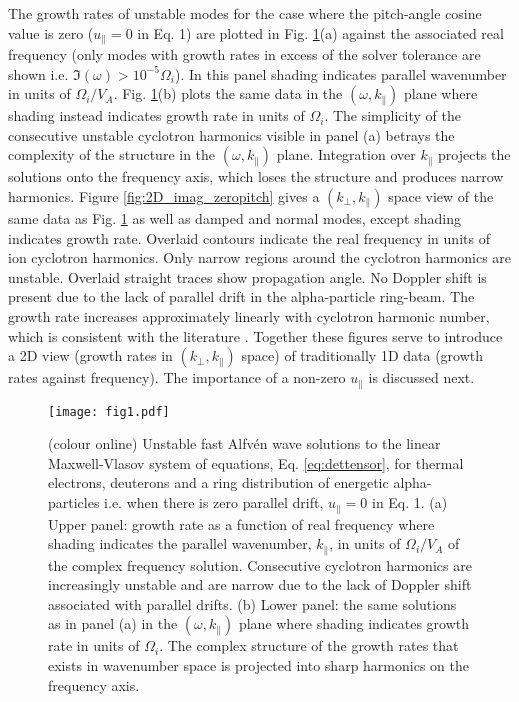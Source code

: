 \documentclass[12pt]{iopart}
\begin{document}
The growth rates of unstable modes for the case where the pitch-angle cosine
value is zero ($u_\parallel = 0$ in Eq. 1) are plotted in Fig.
\ref{fig:2D_F12_zeropitch}(a) against the associated real frequency (only modes
with growth rates in excess of the solver tolerance are shown i.e. $\Im(\omega)
> 10^{-5} \Omega_i$). In this panel shading indicates parallel wavenumber in
units of $\Omega_i/V_A$. Fig. \ref{fig:2D_F12_zeropitch}(b) plots the same data
in the $(\omega,k_\parallel)$ plane where shading instead indicates growth
rate in units of $\Omega_i$.
The simplicity of the consecutive unstable cyclotron harmonics visible in
panel (a) betrays the complexity of the structure in the $(\omega,k_\parallel)$
plane. Integration over $k_\parallel$ projects the solutions onto the frequency
axis, which loses the structure and produces narrow harmonics. Figure
\ref{fig:2D_imag_zeropitch} gives a $(k_\perp, k_\parallel)$ space view of the
same data as Fig. \ref{fig:2D_F12_zeropitch} as well as damped and
normal modes, except shading indicates growth rate. Overlaid
contours indicate the real frequency in units of ion cyclotron harmonics. Only
narrow regions around the cyclotron harmonics are unstable. Overlaid straight
traces show propagation angle. No Doppler shift is present due to the lack
of parallel drift in the alpha-particle ring-beam. The growth rate increases
approximately linearly with cyclotron harmonic number, which is consistent with
the literature \cite{Dendy1994}. Together these figures serve to introduce a 2D
view (growth rates in $(k_\perp, k_\parallel)$ space) of traditionally 1D data
(growth rates against frequency). The importance of a non-zero $u_\parallel$ is
discussed next.

\begin{figure}[ht!]
    \raggedleft
\texttt{[image: fig1.pdf]}
    \caption{(colour online) Unstable fast Alfv{\'e}n wave solutions to the
    linear Maxwell-Vlasov system of equations, Eq. \ref{eq:dettensor}, for
    thermal electrons, deuterons and a ring distribution of energetic
    alpha-particles i.e. when there is zero parallel drift, $u_\parallel=0$ in
    Eq. 1. (a) Upper panel: growth rate as a function of real frequency where shading
    indicates the parallel wavenumber, $k_\parallel$, in units of $\Omega_i/V_A$
    of the complex frequency solution. Consecutive cyclotron harmonics are
    increasingly unstable and are narrow due to the lack of Doppler shift 
    associated with parallel drifts. (b) Lower panel: the same solutions
    as in panel (a) in the $(\omega,k_\parallel)$ plane where shading indicates 
    growth rate in units of $\Omega_i$.
    The complex structure of the growth rates that exists in
    wavenumber space is projected into sharp harmonics on the frequency axis.}
    \label{fig:2D_F12_zeropitch}
\end{figure}
\end{document}
